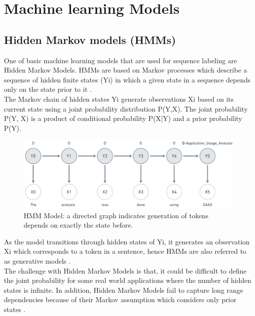 \section{Machine learning Models}
\label{sec:chapter05:MLModels}

\subsection{Hidden Markov models (\ac{HMM}s)}
\label{sec:chapter05:MLModels:HMMS}

One of basic machine learning models that are used for sequence labeling are Hidden Markov Models. HMMs are based on Markov processes which describe a sequence of hidden finite states (Yi) in which a given state in a sequence depends only on the state prior to it \citep{aggarwal2018machine, gagniuc2017markov}. \\

The Markov chain of hidden states Yi generate observations Xi based on its current state using a joint probability distribution P(Y,X). The joint probability P(Y, X) is a product of conditional probability  P(X|Y) and a prior probability P(Y).  \\

\begin{figure}[htbp]
	\centering
	\includegraphics[width=.75\textwidth]{4.graphics/figures/ch_5/HMM}
	\caption{\ac{HMM} Model: a directed graph indicates generation of tokens depends on exactly the state before.}
	\label{fig:chapter03:setup}
\end{figure}

As the model transitions through hidden states of Yi, it generates an observation Xi which corresponds to a token in a sentence, hence HMMs are also referred to as generative models \citep{aggarwal2018machine}. \\

The challenge with Hidden Markov Models is that, it could be difficult to define the joint probability for some real world applications where the number of hidden states is infinite. In addition, Hidden Markov Models fail to capture long range dependencies because of their Markov assumption which considers only prior states \citep{bulla2006application, wallach2004conditional}.
 
